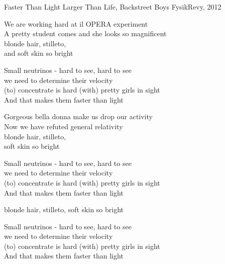 \begin{song}{Faster Than Light}
  {} %
  {Larger Than Life, Backstreet Boys} %
  {} %
  {FysikRevy, 2012} %
  {\NotCCLIed} %

  \begin{SBVerse}
    We are working hard at il OPERA experiment\\
    A pretty student comes and she looks so magnificent\\
    blonde hair, stilleto,\\
    and soft skin so bright
  \end{SBVerse}

  \begin{SBChorus}
    Small neutrinos - hard to see, hard to see\\
    we need to determine their velocity\\
    (to) concentrate is hard (with) pretty girls in sight\\
    And that makes them faster than light
  \end{SBChorus}

  \begin{SBVerse}
    Gorgeous bella donna make us drop our activity\\
    Now we have refuted general relativity\\
    blonde hair, stilleto,\\
    soft skin so bright
  \end{SBVerse}

  \begin{SBChorus}
    Small neutrinos - hard to see, hard to see\\
    we need to determine their velocity\\
    (to) concentrate is hard (with) pretty girls in sight\\
    And that makes them faster than light
  \end{SBChorus}

  \begin{SBSection*}
    blonde hair, stilleto, soft skin so bright
  \end{SBSection*}

  \begin{SBChorus}
    Small neutrinos - hard to see, hard to see\\
    we need to determine their velocity\\
    (to) concentrate is hard (with) pretty girls in sight\\
    And that makes them faster than light
  \end{SBChorus}
\end{song}